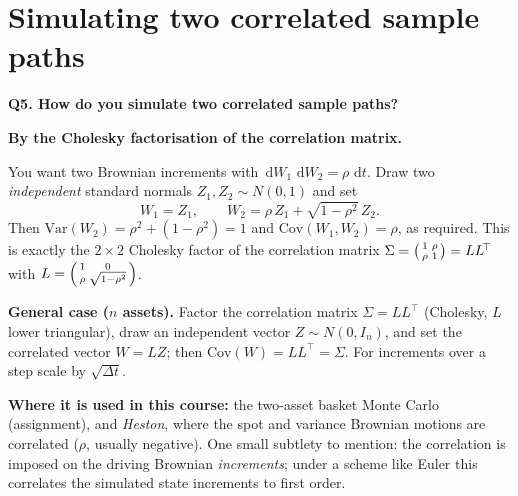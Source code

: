\documentclass[11pt]{article}
\newcommand{\dd}{\,\mathrm{d}}
\newcommand{\Qhead}[1]{\bigskip\noindent\textbf{\large #1}\par\nobreak\smallskip}
\begin{document}
\section{Simulating two correlated sample paths}
\Qhead{Q5. How do you simulate two correlated sample paths?}
\textbf{By the Cholesky factorisation of the correlation matrix.}

You want two Brownian increments with $\dd W_1\,\dd W_2=\rho\,\dd t$. Draw two \emph{independent} standard
normals $Z_1,Z_2\sim N(0,1)$ and set
\begin{equation}\label{eq:chol2}
\boxed{\;W_1=Z_1,\qquad W_2=\rho\,Z_1+\sqrt{1-\rho^2}\,Z_2.\;}
\end{equation}
Then $\mathrm{Var}(W_2)=\rho^2+(1-\rho^2)=1$ and $\mathrm{Cov}(W_1,W_2)=\rho$, as required. This is exactly the
$2\times2$ Cholesky factor of the correlation matrix
$\Sigma=\begin{psmallmatrix}1&\rho\\ \rho&1\end{psmallmatrix}=LL^{\!\top}$ with
$L=\begin{psmallmatrix}1&0\\ \rho&\sqrt{1-\rho^2}\end{psmallmatrix}$.

\textbf{General case ($n$ assets).} Factor the correlation matrix $\Sigma=LL^{\!\top}$ (Cholesky, $L$ lower
triangular), draw an independent vector $Z\sim N(0,I_n)$, and set the correlated vector $W=LZ$; then
$\mathrm{Cov}(W)=L L^{\!\top}=\Sigma$. For increments over a step scale by $\sqrt{\Delta t}$.

\textbf{Where it is used in this course:} the two-asset basket Monte Carlo (assignment), and \emph{Heston},
where the spot and variance Brownian motions are correlated ($\rho$, usually negative). One small subtlety to
mention: the correlation is imposed on the driving Brownian \emph{increments}; under a scheme like Euler this
correlates the simulated state increments to first order.

\end{document}
